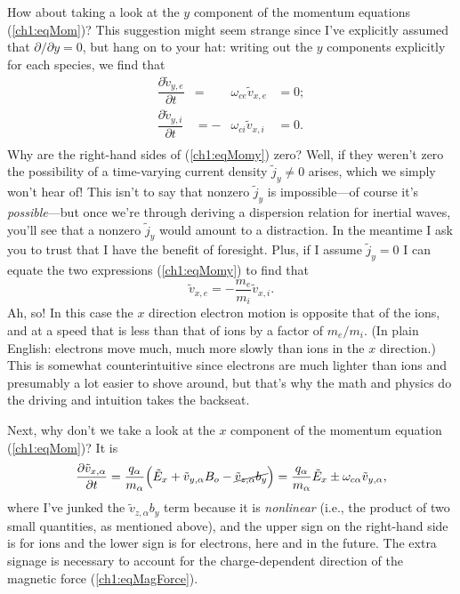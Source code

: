 How about taking a look at the $y$ component of the momentum equations
(\ref{ch1:eqMom})? This suggestion might seem strange since I've explicitly
assumed that $\partial / \partial y = 0$, but hang on to your hat: writing out
the $y$ components explicitly for each species, we find that
\begin{equation} 
  \begin{alignedat}{2}
    \label{ch1:eqMomy} \dfrac{\partial \tilde v_{y,e}}{\partial t} &=
    &\omega_{ce} \tilde v_{x,e} &= 0; \\
    \dfrac{\partial \tilde v_{y,i}}{\partial t} &=
    - &\omega_{ci} \tilde v_{x,i} &= 0. \\
  \end{alignedat}
\end{equation}
Why are the right-hand sides of (\ref{ch1:eqMomy}) zero?  Well, if they weren't
zero the possibility of a time-varying current density $\tilde j_y \neq 0$
arises, which we simply won't hear of! This isn't to say that nonzero
$\tilde j_y$ is impossible---of course it's \emph{possible}---but once we're
through deriving a dispersion relation for inertial \Alf waves, you'll see that
a nonzero $\tilde j_y$ would amount to a distraction. In the meantime I ask you
to trust that I have the benefit of foresight. Plus, if I assume
$\tilde j_y = 0$ I can equate the two expressions (\ref{ch1:eqMomy}) to find
that
\begin{equation} 
  \tilde v_{x,e} = - \dfrac{m_e}{m_i} \tilde v_{x,i}.
\end{equation}
Ah, so! In this case the $x$ direction electron motion is opposite that of the
ions, and at a speed that is less than that of ions by a factor of $m_e /
m_i$. (In plain English: electrons move much, much more slowly than ions in the
$x$ direction.) This is somewhat counterintuitive since electrons are much
lighter than ions and presumably a lot easier to shove around, but that's why
the math and physics do the driving and intuition takes the backseat.

Next, why don't we take a look at the $x$ component of the momentum equation
(\ref{ch1:eqMom})? It is
\begin{equation} \label{ch1:eqMomx} \dfrac{\partial \tilde v_{x,\alpha}}{\partial t} =
  \dfrac{q_\alpha}{m_\alpha} \Big ( \tilde E_x + \tilde v_{y,\alpha} B_o - \cancel{\tilde v_{z,\alpha} b_y}
  \Big ) = \dfrac{q_\alpha}{m_\alpha} \tilde E_x \pm \omega_{c \alpha} \tilde v_{y,\alpha},
\end{equation}
where I've junked the $\tilde v_{z,\alpha} b_y$ term because it is \emph{nonlinear}
(i.e., the product of two small quantities, as mentioned above), and the upper
sign on the right-hand side is for ions and the lower sign is for electrons,
here and in the future. The extra signage is necessary to account for the
charge-dependent direction of the magnetic force (\ref{ch1:eqMagForce}).

